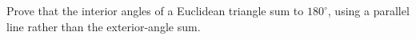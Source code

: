 Prove that the interior angles of a Euclidean triangle sum to $180^\circ$, using a parallel line rather than the exterior-angle sum.
